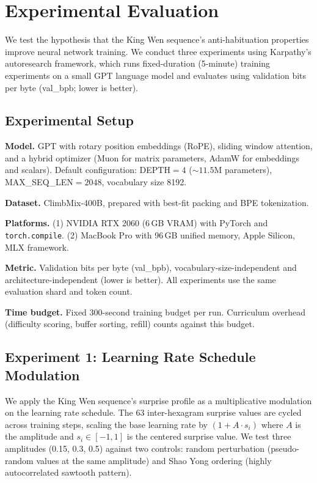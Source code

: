 \documentclass{article}
\begin{document}
\section{Experimental Evaluation}\label{sec:experiments}

We test the hypothesis that the King Wen sequence's anti-habituation properties improve neural network training. We conduct three experiments using Karpathy's autoresearch framework, which runs fixed-duration (5-minute) training experiments on a small GPT language model and evaluates using validation bits per byte (val\_bpb; lower is better).

\subsection{Experimental Setup}

\textbf{Model.} GPT with rotary position embeddings (RoPE), sliding window attention, and a hybrid optimizer (Muon for matrix parameters, AdamW for embeddings and scalars). Default configuration: DEPTH${}=4$ (${\sim}11.5$M parameters), MAX\_SEQ\_LEN${}=2048$, vocabulary size 8192.

\textbf{Dataset.} ClimbMix-400B, prepared with best-fit packing and BPE tokenization.

\textbf{Platforms.} (1) NVIDIA RTX 2060 (6\,GB VRAM) with PyTorch and \texttt{torch.compile}. (2) MacBook Pro with 96\,GB unified memory, Apple Silicon, MLX framework.

\textbf{Metric.} Validation bits per byte (val\_bpb), vocabulary-size-independent and architecture-independent (lower is better). All experiments use the same evaluation shard and token count.

\textbf{Time budget.} Fixed 300-second training budget per run. Curriculum overhead (difficulty scoring, buffer sorting, refill) counts against this budget.

\subsection{Experiment 1: Learning Rate Schedule Modulation}

We apply the King Wen sequence's surprise profile as a multiplicative modulation on the learning rate schedule. The 63 inter-hexagram surprise values are cycled across training steps, scaling the base learning rate by $(1 + A \cdot s_i)$ where $A$ is the amplitude and $s_i \in [-1, 1]$ is the centered surprise value. We test three amplitudes (0.15, 0.3, 0.5) against two controls: random perturbation (pseudo-random values at the same amplitude) and Shao Yong ordering (highly autocorrelated sawtooth pattern).
\end{document}
